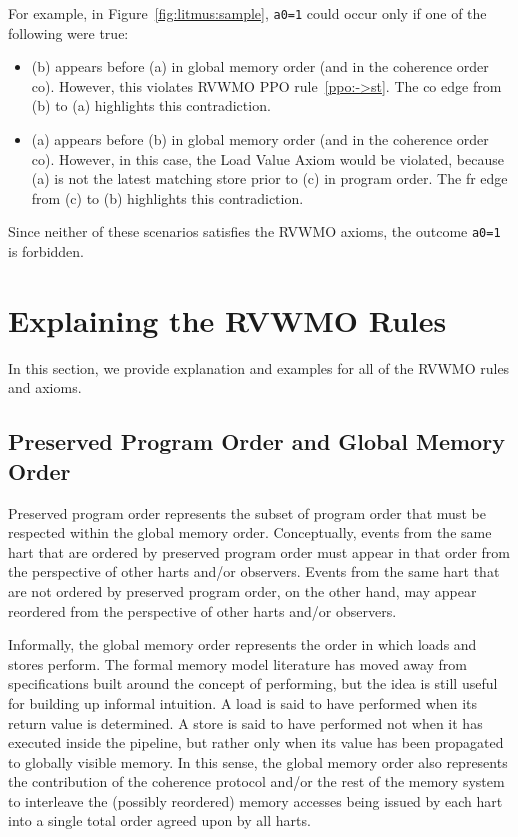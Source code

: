 For example, in Figure~\ref{fig:litmus:sample}, {\tt a0=1} could occur only if one of the following were true:
\begin{itemize}
  \item (b) appears before (a) in global memory order (and in the coherence order {\sf co}).  However, this violates RVWMO PPO rule~\ref{ppo:->st}.  The {\sf co} edge from (b) to (a) highlights this contradiction.
  \item (a) appears before (b) in global memory order (and in the coherence order {\sf co}).  However, in this case, the Load Value Axiom would be violated, because (a) is not the latest matching store prior to (c) in program order.  The {\sf fr} edge from (c) to (b) highlights this contradiction.
\end{itemize}
Since neither of these scenarios satisfies the RVWMO axioms, the outcome {\tt a0=1} is forbidden.
\section{Explaining the RVWMO Rules}
In this section, we provide explanation and examples for all of the RVWMO rules and axioms.

\subsection{Preserved Program Order and Global Memory Order}
Preserved program order represents the subset of program order that must be respected within the global memory order.
Conceptually, events from the same hart that are ordered by preserved program order must appear in that order from the perspective of other harts and/or observers.
Events from the same hart that are not ordered by preserved program order, on the other hand, may appear reordered from the perspective of other harts and/or observers.

Informally, the global memory order represents the order in which loads and stores perform.
The formal memory model literature has moved away from specifications built around the concept of performing, but the idea is still useful for building up informal intuition.
A load is said to have performed when its return value is determined.
A store is said to have performed not when it has executed inside the pipeline, but rather only when its value has been propagated to globally visible memory.
In this sense, the global memory order also represents the contribution of the coherence protocol and/or the rest of the memory system to interleave the (possibly reordered) memory accesses being issued by each hart into a single total order agreed upon by all harts.

